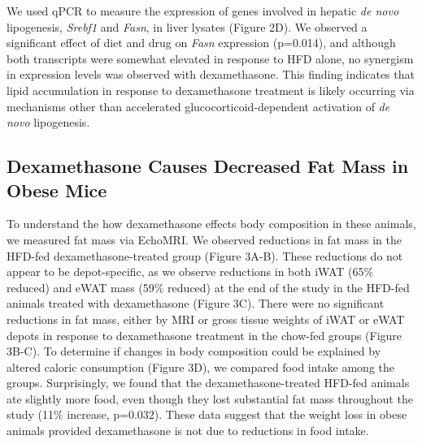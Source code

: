 \documentclass[11pt]{article} %
\begin{document}
We used qPCR to measure the expression of genes involved in hepatic
\emph{de novo} lipogenesis, \emph{Srebf1} and \emph{Fasn}, in liver
lysates (Figure 2D). We observed a significant effect of diet and drug
on \emph{Fasn} expression (p=0.014), and although both transcripts were
somewhat elevated in response to HFD alone, no synergism in expression
levels was observed with dexamethasone. This finding indicates that
lipid accumulation in response to dexamethasone treatment is likely
occurring via mechanisms other than accelerated glucocorticoid-dependent
activation of \emph{de novo} lipogenesis.

\subsection*{Dexamethasone Causes Decreased Fat Mass in Obese
Mice}\label{dexamethasone-causes-decreased-fat-mass-in-obese-mice}

To understand the how dexamethasone effects body composition in these
animals, we measured fat mass via EchoMRI. We observed reductions in fat
mass in the HFD-fed dexamethasone-treated group (Figure 3A-B). These
reductions do not appear to be depot-specific, as we observe reductions
in both iWAT (65\% reduced) and eWAT mass (59\% reduced) at the end of
the study in the HFD-fed animals treated with dexamethasone (Figure 3C).
There were no significant reductions in fat mass, either by MRI or gross
tissue weights of iWAT or eWAT depots in response to dexamethasone
treatment in the chow-fed groups (Figure 3B-C). To determine if changes
in body composition could be explained by altered caloric consumption
(Figure 3D), we compared food intake among the groups. Surprisingly, we
found that the dexamethasone-treated HFD-fed animals ate slightly more
food, even though they lost substantial fat mass throughout the study
(11\% increase, p=0.032). These data suggest that the weight loss in
obese animals provided dexamethasone is not due to reductions in food
intake.
\end{document}

